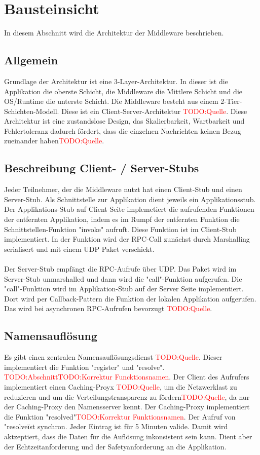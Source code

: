 \chapter{Bausteinsicht}
In diesem Abschnitt wird die Architektur der Middleware beschrieben.

\section{Allgemein}
Grundlage der Architektur ist eine 3-Layer-Architektur. In dieser ist die Applikation die oberste Schicht, die Middleware die Mittlere Schicht und die OS/Runtime die unterste Schicht. Die Middleware besteht aus einem 2-Tier-Schichten-Modell. Diese ist ein Client-Server-Architektur \textcolor{red}{TODO:Quelle}. Diese Architektur ist eine zustandslose Design, das Skalierbarkeit, Wartbarkeit und Fehlertoleranz dadurch  fördert, dass die einzelnen Nachrichten keinen Bezug zueinander haben\textcolor{red}{TODO:Quelle}.

\section{Beschreibung Client- / Server-Stubs}
Jeder Teilnehmer, der die Middleware nutzt hat einen Client-Stub und einen Server-Stub. Als Schnittstelle zur Applikation dient jeweils ein Applikationsstub. Der Applikations-Stub auf Client Seite implemetiert die aufrufenden Funktionen der entfernten Applikation, indem es im Rumpf der entfernten Funktion die Schnittstellen-Funktion "invoke" aufruft. Diese Funktion ist im Client-Stub implementiert. In der Funktion wird der RPC-Call zunächst durch Marshalling serialisert und mit einem UDP Paket verschickt.\\\\
Der Server-Stub empfängt die RPC-Aufrufe über UDP. Das Paket wird im Server-Stub unmarshalled und dann wird die "call"-Funktion aufgerufen. Die "call"-Funktion wird im Applikation-Stub auf der Server Seite implementiert. Dort wird per Callback-Pattern die Funktion der lokalen Applikation aufgerufen. Das wird bei asynchronen RPC-Aufrufen bevorzugt \textcolor{red}{TODO:Quelle}.

\section{Namensauflösung}
Es gibt einen zentralen Namensauflösungsdienst \textcolor{red}{TODO:Quelle}. Dieser implementiert die Funktion "register" und "resolve". \textcolor{red}{TODO:Abschnitt}\textcolor{red}{TODO:Korrektur Funcktionsnamen}. Der Client des Aufrufers implementiert einen Caching-Proyx \textcolor{red}{TODO:Quelle}, um die Netzwerklast zu reduzieren und um die Verteilungstransparenz zu fördern\textcolor{red}{TODO:Quelle}, da nur der Caching-Proxy den Namensserver kennt. Der Caching-Proxy implementiert die Funktion "resolved"\textcolor{red}{TODO:Korrektur Funktionsnamen}. Der Aufruf von "resolve\" ist synchron. Jeder Eintrag ist für 5 Minuten valide. Damit wird aktzeptiert, dass die Daten für die Auflösung inkonsistent sein kann. Dient aber der Echtzeitanforderung und der Safetyanforderung an die Applikation.


